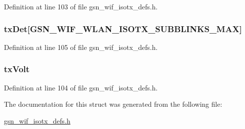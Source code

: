 Definition at line 103 of file gsn\_\-wif\_\-isotx\_\-defs.h.

\hypertarget{a00384_a93867b08eedbd25ecb7eee27c16f703f}{
\subsubsection[{txDet}]{ {\bf txDet}\mbox{[}GSN\_\-WIF\_\-WLAN\_\-ISOTX\_\-SUBBLINKS\_\-MAX\mbox{]}}}
\label{a00384_a93867b08eedbd25ecb7eee27c16f703f}


Definition at line 105 of file gsn\_\-wif\_\-isotx\_\-defs.h.

\hypertarget{a00384_af0db1cb3f04aeef18e0380f46296ec42}{
\subsubsection[{txVolt}]{ {\bf txVolt}}}
\label{a00384_af0db1cb3f04aeef18e0380f46296ec42}


Definition at line 104 of file gsn\_\-wif\_\-isotx\_\-defs.h.



The documentation for this struct was generated from the following file:\begin{DoxyCompactItemize}
\item 
\hyperlink{a00611}{gsn\_\-wif\_\-isotx\_\-defs.h}\end{DoxyCompactItemize}
